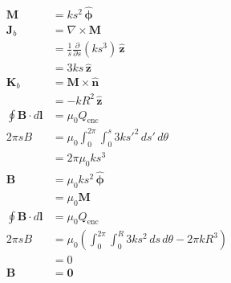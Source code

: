 \documentclass{article}
\renewcommand{\vec}[1]{\boldsymbol{\mathbf{#1}}}
\newcommand{\uvec}[1]{\hat{\vec{#1}}}
\begin{document}
\subsection{}

\begin{align*}
  \vec{M}                       & = k s^2 \,\uvec{\phi}                                                                 \\
  \vec{J}_b                     & = \nabla \times \vec{M}                                                               \\
                                & = \frac{1}{s} \frac{\partial}{\partial s} (k s^3) \,\uvec{z}                          \\
                                & = 3 k s \,\uvec{z}                                                                    \\
  \vec{K}_b                     & = \vec{M} \times \uvec{n}                                                             \\
                                & = -k R^2 \,\uvec{z}                                                                   \\
  \oint \vec{B} \cdot d \vec{l} & = \mu_0 Q_\text{enc}                                                                  \\
  2 \pi s B                     & = \mu_0 \int_0^{2 \pi} \int_0^s 3 k s'^2 \,d s' \,d \theta                            \\
                                & = 2 \pi \mu_0 k s^3                                                                   \\
  \vec{B}                       & = \mu_0 k s^2 \,\uvec{\phi}                                                           \\
                                & = \mu_0 \vec{M}                                                                       \\
  \oint \vec{B} \cdot d \vec{l} & = \mu_0 Q_\text{enc}                                                                  \\
  2 \pi s B                     & = \mu_0 \left( \int_0^{2 \pi} \int_0^R 3 k s^2 \,d s \,d \theta - 2 \pi k R^3 \right) \\
                                & = 0                                                                                   \\
  \vec{B}                       & = \vec{0}
\end{align*}
\end{document}
